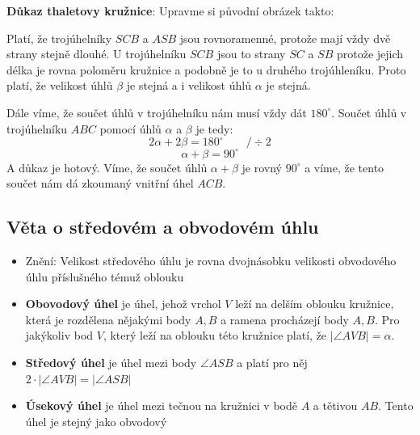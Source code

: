 \documentclass[12pt]{article}
\begin{document}
\textbf{Důkaz thaletovy kružnice}: Upravme si původní obrázek takto:\\

Platí, že trojúhelníky $SCB$ a $ASB$ jsou rovnoramenné, protože mají vždy dvě strany stejně dlouhé. U trojúhelníku $SCB$ jsou to strany $SC$ a $SB$ protože jejich délka je rovna poloměru kružnice a podobně je to u druhého trojúhleníku. Proto platí, že velikost úhlů $\beta$ je stejná a i velikost úhlů $\alpha$ je stejná.

Dále víme, že součet úhlů v trojúhelníku nám musí vždy dát $180^\circ$. Součet úhlů v trojúhelníku $ABC$ pomocí úhlů $\alpha$ a $\beta$ je tedy:
\[2\alpha + 2\beta = 180^\circ  \qquad \slash \div 2\]
\[\alpha + \beta = 90^\circ\]
A důkaz je hotový. Víme, že součet úhlů $\alpha + \beta$ je rovný $90^\circ$ a víme, že tento součet nám dá zkoumaný vnitřní úhel $ACB$.
\subsection*{Věta o středovém a obvodovém úhlu}
\begin{itemize}
    \item Znění: Velikost středového úhlu je rovna dvojnásobku velikosti obvodového úhlu příslušného témuž oblouku
    \item \textbf{Obovodový úhel} je úhel, jehož vrchol $V$ leží na delším oblouku kružnice, která je rozdělena nějakými body $A,B$ a ramena procházejí body $A,B$. Pro jakýkoliv bod $V$, který leží na oblouku této kružnice platí, že $|\angle AVB| = \alpha$.
    \item \textbf{Středový úhel} je úhel mezi body $\angle ASB$ a platí pro něj $2 \cdot |\angle AVB| = |\angle ASB|$
    \item \textbf{Úsekový úhel} je úhel mezi tečnou na kružnici v bodě $A$ a tětivou $AB$. Tento úhel je stejný jako obvodový
\end{itemize}
\end{document}
